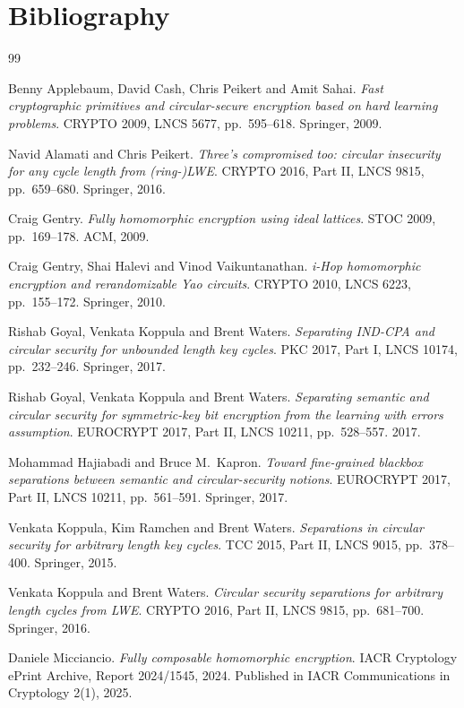 \documentclass{aicr-conjecture}
\begin{document}
\section{Bibliography}

\begin{aicrbibliography}{99}

Benny Applebaum, David Cash, Chris Peikert and Amit Sahai.
\emph{Fast cryptographic primitives and circular-secure encryption
based on hard learning problems}.
CRYPTO 2009, LNCS 5677, pp.\ 595--618. Springer, 2009.

Navid Alamati and Chris Peikert.
\emph{Three's compromised too: circular insecurity for any cycle length
from (ring-)LWE}.
CRYPTO 2016, Part II, LNCS 9815, pp.\ 659--680. Springer, 2016.

Craig Gentry.
\emph{Fully homomorphic encryption using ideal lattices}.
STOC 2009, pp.\ 169--178. ACM, 2009.

Craig Gentry, Shai Halevi and Vinod Vaikuntanathan.
\emph{i-Hop homomorphic encryption and rerandomizable Yao circuits}.
CRYPTO 2010, LNCS 6223, pp.\ 155--172. Springer, 2010.

Rishab Goyal, Venkata Koppula and Brent Waters.
\emph{Separating IND-CPA and circular security for unbounded length key
cycles}.
PKC 2017, Part I, LNCS 10174, pp.\ 232--246. Springer, 2017.

Rishab Goyal, Venkata Koppula and Brent Waters.
\emph{Separating semantic and circular security for symmetric-key bit
encryption from the learning with errors assumption}.
EUROCRYPT 2017, Part II, LNCS 10211, pp.\ 528--557. 2017.

Mohammad Hajiabadi and Bruce M.\ Kapron.
\emph{Toward fine-grained blackbox separations between semantic and
circular-security notions}.
EUROCRYPT 2017, Part II, LNCS 10211, pp.\ 561--591. Springer, 2017.

Venkata Koppula, Kim Ramchen and Brent Waters.
\emph{Separations in circular security for arbitrary length key
cycles}.
TCC 2015, Part II, LNCS 9015, pp.\ 378--400. Springer, 2015.

Venkata Koppula and Brent Waters.
\emph{Circular security separations for arbitrary length cycles from
LWE}.
CRYPTO 2016, Part II, LNCS 9815, pp.\ 681--700. Springer, 2016.

Daniele Micciancio.
\emph{Fully composable homomorphic encryption}.
IACR Cryptology ePrint Archive, Report 2024/1545, 2024. Published in
IACR Communications in Cryptology 2(1), 2025.

\end{aicrbibliography}
\end{document}
